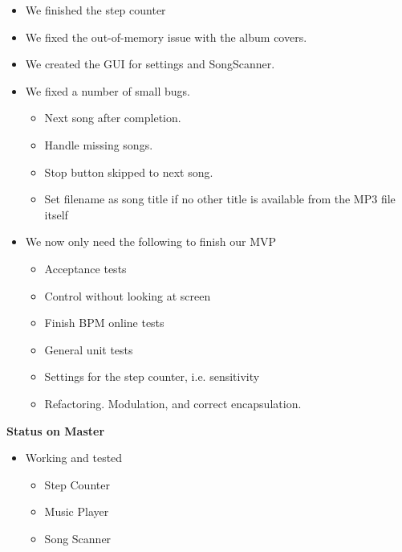 \begin{itemize}
\item We finished the step counter
\item We fixed the out-of-memory issue with the album covers.
\item We created the GUI for settings and SongScanner.
\item We fixed a number of small bugs.
\begin{itemize}
\item Next song after completion.
\item Handle missing songs.
\item Stop button skipped to next song.
\item Set filename as song title if no other title is available from the MP3 file itself 
\end{itemize}
\item We now only need the following to finish our MVP
\begin{itemize}
\item Acceptance tests
\item Control without looking at screen
\item Finish BPM online tests
\item General unit tests
\item Settings for the step counter, i.e. sensitivity
\item Refactoring. Modulation, and correct encapsulation.
\end{itemize}
\end{itemize}

\textbf{Status on Master}
\begin{itemize}
\item Working and tested
\begin{itemize}
\item Step Counter
\item Music Player
\item Song Scanner
\end{itemize}
\end{itemize}

